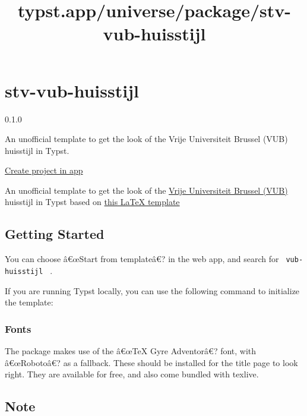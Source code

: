 \title{typst.app/universe/package/stv-vub-huisstijl}

\label{banner}
\label{template-thumbnail}

\section{stv-vub-huisstijl}\label{stv-vub-huisstijl}

{ 0.1.0 }

An unofficial template to get the look of the Vrije Universiteit Brussel
(VUB) huisstijl in Typst.

\href{/app?template=stv-vub-huisstijl&version=0.1.0}{Create project in
app}

\label{readme}
An unofficial template to get the look of the
\href{https://www.vub.be/}{Vrije Universiteit Brussel (VUB)} huisstijl
in Typst based on \href{https://gitlab.com/rubdos/texlive-vub}{this
LaTeX template}

\subsection{Getting Started}\label{getting-started}

You can choose â€œStart from templateâ€? in the web app, and search for
\texttt{\ vub-huisstijl\ } .

If you are running Typst locally, you can use the following command to
initialize the template:

\begin{Shaded}
\begin{Highlighting}[]
\end{Highlighting}
\end{Shaded}

\subsubsection{Fonts}\label{fonts}

The package makes use of the â€œTeX Gyre Adventorâ€? font, with
â€œRobotoâ€? as a fallback. These should be installed for the title page
to look right. They are available for free, and also come bundled with
texlive.

\subsection{Note}\label{note}

